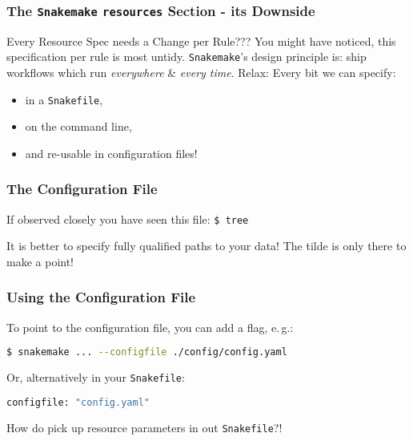 \begin{frame}
  \frametitle{The \texttt{Snakemake} \texttt{resources} Section - its Downside}
  \begin{block}{Every Resource Spec needs a Change per Rule???}
   You might have noticed, this specification per rule is most untidy. \texttt{Snakemake}'s design principle is: ship workflows which run \emph{everywhere} \& \emph{every time}.
   \newline \pause
   Relax: Every bit we can specify:
   \begin{itemize}
    \item in a \texttt{Snakefile},
    \item on the command line,
    \item and re-usable in configuration files!
   \end{itemize}

  \end{block}

\end{frame} 

\begin{frame}
  \frametitle{The Configuration File}
  If observed closely you have seen this file:\newline
            {\tiny \DTsetlength{0.2em}{1em}{0.2em}{0.4pt}{.6pt}
\texttt{\$ tree}
}
 \pause
 \pause
 \begin{warning}
 	It is better to specify fully qualified paths to your data! The tilde is only there to make a point!
 \end{warning}
\end{frame}

\begin{frame}[fragile]
  \frametitle{Using the Configuration File}
  To point to the configuration file, you can add a flag, e.\,g.:
  \begin{lstlisting}[language=Bash, style=Shell]
$ snakemake ... --configfile ./config/config.yaml  
  \end{lstlisting}
  Or, alternatively in your \texttt{Snakefile}:
  \begin{lstlisting}[language=Python,style=Python]
configfile: "config.yaml"
  \end{lstlisting}  
  \begin{question}
  	How do pick up resource parameters in out \texttt{Snakefile}?!
  \end{question}
\end{frame} 

